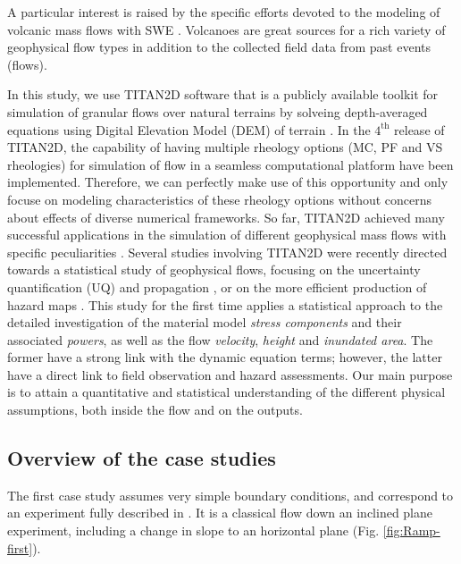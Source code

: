 \documentclass{article}
\begin{document}
A particular interest is raised by the specific efforts devoted to the modeling of volcanic mass flows with SWE \citep{FreundtBursik1998,Bursik2005,Saucedo2005, Kelfoun2005,Charbonnier2009,Kelfoun2009,Procter2010,Sulpizio2010,Kelfoun2011,Charbonnier2013}. Volcanoes are great sources for a rich variety of geophysical flow types in addition to the collected field data from past events (flows).

In this study, we use TITAN2D software that is a publicly available toolkit for simulation of granular flows over natural terrains by solveing depth-averaged equations using Digital Elevation Model (DEM) of terrain \citep{Pitman2003a, Patra2005}. In the $\mathrm{4^{th}}$ release of TITAN2D, the capability of having multiple rheology options (MC, PF and VS rheologies) for simulation of flow in a seamless computational platform have been implemented. Therefore, we can perfectly make use of this opportunity and only focuse on modeling characteristics of these rheology options without concerns about effects of diverse numerical frameworks. So far, TITAN2D achieved many successful applications in the simulation of different geophysical mass flows with specific peculiarities \citep{Sheridan2005, Rupp2006, Norini2008, Charbonnier2009, Procter2010, Sheridan2010, Sulpizio2010, Capra2011}. Several studies involving TITAN2D were recently directed towards a statistical study of geophysical flows, focusing on the uncertainty quantification (UQ) and propagation \citep{Dalbey2008, Dalbey2009, Stefanescu2012a, Stefanescu2012b}, or on the more efficient production of hazard maps \citep{Bayarri2009, Spiller2014,Bayarri2015, Ogburn2016}. This study for the first time applies a statistical approach to the detailed investigation of the material model \emph{stress components} and their associated \emph{powers}, as well as the flow \emph{velocity}, \emph{height} and \emph{inundated area}. The former have a strong link with the dynamic equation terms; however, the latter have a direct link to field observation and hazard assessments. Our main purpose is to attain a quantitative and statistical understanding of the different physical assumptions, both inside the flow and on the outputs.

\subsection{Overview of the case studies}
The first case study assumes very simple boundary conditions, and correspond to an experiment fully described in \cite{Webb2004, Bursik2005, WebbBursik2016}. It is a classical flow down an inclined plane experiment, including a change in slope to an horizontal plane (Fig. \ref{fig:Ramp-first}).
\end{document}
